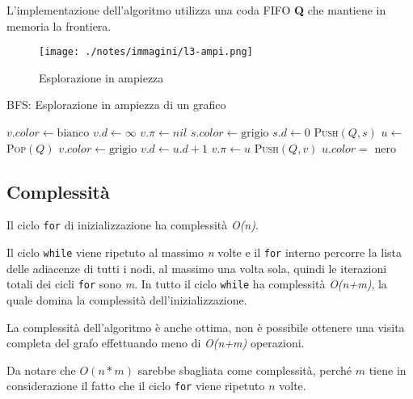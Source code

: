 L'implementazione dell'algoritmo utilizza una coda FIFO \textbf{Q} che
mantiene in memoria la frontiera.

\begin{figure}[htbp]
\centering
\texttt{[image: ./notes/immagini/l3-ampi.png]}
\caption{Esplorazione in ampiezza}
\end{figure}

\begin{breakablealgorithm}
	\caption{BFS: Esplorazione in ampiezza di un grafico}
	\begin{algorithmic}[1]
				\State $ v.color \gets \text{bianco} $ 
				\State $ v.d \gets \infty $ 
				\State $ v.\pi \gets nil $
			\EndFor
			\State $ s.color \gets \text{grigio} $
			\State $ s.d \gets 0 $
			\State \textsc{Push}$ (Q,s)$
				\State $ u \gets $ \textsc{Pop}$ (Q) $
						\State $ v.color \gets \text{grigio} $ 
						\State $ v.d \gets u.d + 1 $
						\State $ v.\pi \gets u $
						\State \textsc{Push}$ (Q,v) $
					\EndIf
				\EndFor
				\State $ u.color = $ nero
			\EndWhile
		\EndFunction
	\end{algorithmic}
\end{breakablealgorithm}

\subsection{Complessità}\label{complessituxe0}

Il ciclo \texttt{for} di inizializzazione ha complessità \emph{O(n)}.

Il ciclo \texttt{while} viene ripetuto al massimo \emph{n} volte e il
\texttt{for} interno percorre la lista delle adiacenze di tutti i nodi,
al massimo una volta sola, quindi le iterazioni totali dei cicli
\texttt{for} sono \emph{m}. In tutto il ciclo
\texttt{while} ha complessità \emph{O(n+m)}, la quale domina la
complessità dell'inizializzazione.

La complessità dell'algoritmo è anche ottima, non è possibile ottenere
una visita completa del grafo effettuando meno di \emph{O(n+m)}
operazioni.

Da notare che $O(n*m)$ sarebbe sbagliata come complessità, perché $m$
tiene in considerazione il fatto che il ciclo \texttt{for} viene
ripetuto $n$ volte.

